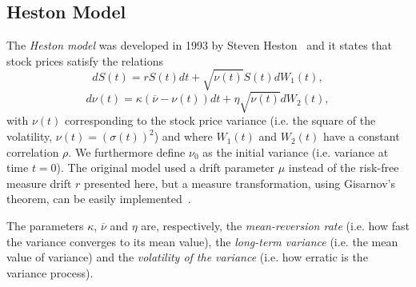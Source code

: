 \subsection{Heston Model}
The \emph{Heston model} was developed in 1993 by Steven Heston~\citep{Heston} and it states that stock prices satisfy the relations
\begin{equation}\label{hestons}
\boxed{dS(t)=rS(t)dt+\sqrt{\nu(t)}S(t)dW_1(t),}
\end{equation}
\begin{equation}\label{hestonv}
\boxed{d\nu(t)=\kappa(\overline{\nu}-\nu(t))dt+\eta\sqrt{\nu(t)}dW_2(t),}
\end{equation}
\noindent with $\nu(t)$ corresponding to the stock price variance (i.e. the square of the volatility, $\nu(t)=(\sigma(t))^2$) and where $W_1(t)$ and $W_2(t)$ have a constant correlation $\rho$. We furthermore define $\nu_0$ as the initial variance (i.e. variance at time $t=0$). The original model used a drift parameter $\mu$ instead of the risk-free measure drift $r$ presented here, but a measure transformation, using Gisarnov's theorem, can be easily implemented~\citep{rouah}.

The parameters $\kappa$, $\overline{\nu}$ and $\eta$ are, respectively, the \emph{mean-reversion rate} (i.e. how fast the variance converges to its mean value), the \emph{long-term variance} (i.e. the mean value of variance) and the \emph{volatility of the variance} (i.e. how erratic is the variance process).



